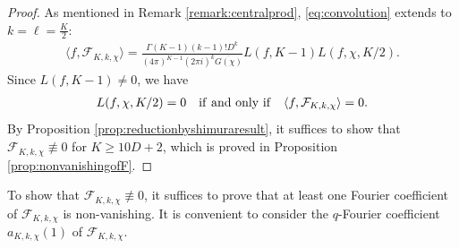 \documentclass[11pt,letterpaper,reqno]{amsart}
\numberwithin{figure}{section}
\numberwithin{table}{section}
\theoremstyle{definition}
\theoremstyle{plain}
\theoremstyle{definition}
\theoremstyle{definition}
\theoremstyle{remark}
\numberwithin{equation}{section}
\theoremstyle{remark}
\begin{document}
\begin{proof}
    As mentioned in Remark \ref{remark:centralprod}, \eqref{eq:convolution} extends to $k=\ell=\frac{K}{2}$:
    \begin{align*}
        \langle f,\mathcal{F}_{K,k,\chi}\rangle=\frac{\Gamma(K-1)(k-1)!D^{k}}{(4\pi)^{K-1}(2\pi i)^{k}\overline{G(\chi)}}L(f,K-1)L(f,\chi,K/2).
    \end{align*}
   Since $L(f,K-1)\neq0$, we have
    \begin{align*}
        L(f,\chi,K/2)=0\quad{\rm if~and~only~if}\quad\langle f,\mathcal{F}_{K,k,\chi}\rangle=0.
    \end{align*}
    By Proposition \ref{prop:reductionbyshimuraresult}, it suffices to show that $\mathcal{F}_{K,k,\chi}\not\equiv0$ for $K\geq10D+2$, which is proved in Proposition \ref{prop:nonvanishingofF}.
\end{proof}
 To show that $\mathcal{F}_{K,k,\chi}\not\equiv0$, it suffices to prove that at least one Fourier coefficient of $\mathcal{F}_{K,k,\chi}$  is non-vanishing. It is convenient to consider the $q$-Fourier coefficient $a_{K,k,\chi}(1)$ of $\mathcal{F}_{K,k,\chi}$. 
\end{document}
